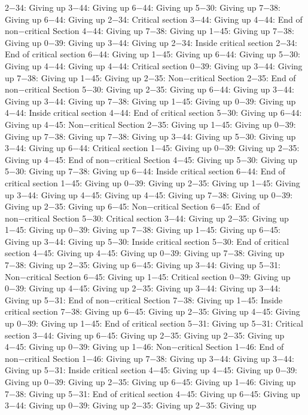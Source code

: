 2−34: Giving up
3−44: Giving up
6−44: Giving up
5−30: Giving up
7−38: Giving up
6−44: Giving up
2−34: Critical section
3−44: Giving up
4−44: End of non−critical Section
4−44: Giving up
7−38: Giving up
1−45: Giving up
7−38: Giving up
0−39: Giving up
3−44: Giving up
2−34: Inside critical section
2−34: End of critical section
6−44: Giving up
1−45: Giving up
6−44: Giving up
5−30: Giving up
4−44: Giving up
4−44: Critical section
0−39: Giving up
3−44: Giving up
7−38: Giving up
1−45: Giving up
2−35: Non−critical Section
2−35: End of non−critical Section
5−30: Giving up
2−35: Giving up
6−44: Giving up
3−44: Giving up
3−44: Giving up
7−38: Giving up
1−45: Giving up
0−39: Giving up
4−44: Inside critical section
4−44: End of critical section
5−30: Giving up
6−44: Giving up
4−45: Non−critical Section
2−35: Giving up
1−45: Giving up
0−39: Giving up
7−38: Giving up
7−38: Giving up
3−44: Giving up
5−30: Giving up
3−44: Giving up
6−44: Critical section
1−45: Giving up
0−39: Giving up
2−35: Giving up
4−45: End of non−critical Section
4−45: Giving up
5−30: Giving up
5−30: Giving up
7−38: Giving up
6−44: Inside critical section
6−44: End of critical section
1−45: Giving up
0−39: Giving up
2−35: Giving up
1−45: Giving up
3−44: Giving up
4−45: Giving up
4−45: Giving up
7−38: Giving up
0−39: Giving up
2−35: Giving up
6−45: Non−critical Section
6−45: End of non−critical Section
5−30: Critical section
3−44: Giving up
2−35: Giving up
1−45: Giving up
0−39: Giving up
7−38: Giving up
1−45: Giving up
6−45: Giving up
3−44: Giving up
5−30: Inside critical section
5−30: End of critical section
4−45: Giving up
4−45: Giving up
0−39: Giving up
7−38: Giving up
7−38: Giving up
2−35: Giving up
6−45: Giving up
3−44: Giving up
5−31: Non−critical Section
6−45: Giving up
1−45: Critical section
0−39: Giving up
0−39: Giving up
4−45: Giving up
2−35: Giving up
3−44: Giving up
3−44: Giving up
5−31: End of non−critical Section
7−38: Giving up
1−45: Inside critical section
7−38: Giving up
6−45: Giving up
2−35: Giving up
4−45: Giving up
0−39: Giving up
1−45: End of critical section
5−31: Giving up
5−31: Critical section
3−44: Giving up
6−45: Giving up
2−35: Giving up
2−35: Giving up
4−45: Giving up
0−39: Giving up
1−46: Non−critical Section
1−46: End of non−critical Section
1−46: Giving up
7−38: Giving up
3−44: Giving up
3−44: Giving up
5−31: Inside critical section
4−45: Giving up
4−45: Giving up
0−39: Giving up
0−39: Giving up
2−35: Giving up
6−45: Giving up
1−46: Giving up
7−38: Giving up
5−31: End of critical section
4−45: Giving up
6−45: Giving up
3−44: Giving up
0−39: Giving up
2−35: Giving up
2−35: Giving up
